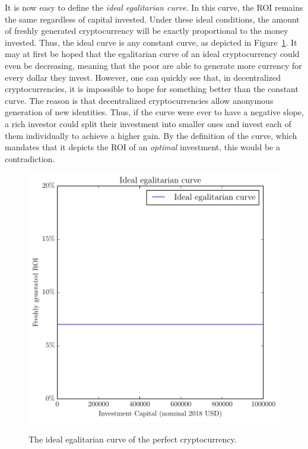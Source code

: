 It is now easy to define the \emph{ideal egalitarian curve}. In this curve, the
ROI remains the same regardless of capital invested. Under these ideal
conditions, the amount of freshly generated cryptocurrency will be exactly
proportional to the money invested. Thus, the ideal curve is any constant curve,
as depicted in Figure~\ref{fig:ideal}. It may at first be hoped that the
egalitarian curve of an ideal cryptocurrency could even be decreasing, meaning
that the poor are able to generate more currency for every dollar they invest.
However, one can quickly see that, in decentralized cryptocurrencies, it is
impossible to hope for something better than the constant curve. The reason is
that decentralized cryptocurrencies allow anonymous generation of new
identities. Thus, if the curve were ever to have a negative slope, a rich
investor could split their investment into smaller ones and invest each of them
individually to achieve a higher gain. By the definition of the curve, which
mandates that it depicts the ROI of an \emph{optimal} investment, this would be
a contradiction.

\begin{figure}[H]
    \caption{The ideal egalitarian curve of the perfect cryptocurrency.}
    \centering
    \includegraphics[width=0.7 \columnwidth,keepaspectratio]{figures/ideal.pdf}
    \label{fig:ideal}
\end{figure}
